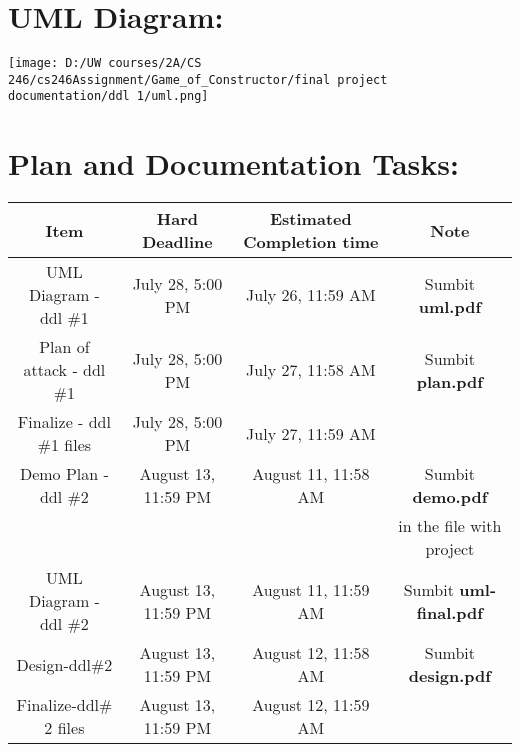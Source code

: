 \documentclass[11pt]{article}
\begin{document}
\parindent=0pt

\newcommand{\colorP}[1]{\colorbox{pink}{#1}}
\newcommand{\colorY}[1]{\colorbox{yellow}{#1}}
\newcommand{\Strategy}{\underline{Strategy} }
\newcommand{\Template}{\underline{Template} }
\newcommand{\Decorator}{\underline{Decorator} }

\section*{UML Diagram:}
\texttt{[image: D:/UW courses/2A/CS 246/cs246Assignment/Game\_of\_Constructor/final project documentation/ddl 1/uml.png]}

\pagebreak

\section*{Plan and Documentation Tasks:}
\begin{tabular}{|c|c|c|c|}\hline
Item & Hard Deadline & Estimated Completion time & Note \\\hline
UML Diagram - ddl \#1 & July 28, 5:00 PM & July 26, 11:59 AM & Sumbit \textbf{uml.pdf}\\\hline
Plan of attack - ddl \#1 & July 28, 5:00 PM & July 27, 11:58 AM & Sumbit \textbf{plan.pdf}\\\hline
Finalize - ddl \#1 files& July 28, 5:00 PM & July 27, 11:59 AM &\\\hline
Demo Plan - ddl \#2 & August 13, 11:59 PM & August 11, 11:58 AM & Sumbit \textbf{demo.pdf} \\
&&&in the file with project\\\hline
UML Diagram - ddl \#2 & August 13, 11:59 PM & August 11, 11:59 AM & Sumbit \textbf{uml-final.pdf}\\\hline
Design-ddl\#2 & August 13, 11:59 PM & August 12, 11:58 AM & Sumbit \textbf{design.pdf}\\\hline
Finalize-ddl\# 2 files & August 13, 11:59 PM & August 12, 11:59 AM & \\\hline
\end{tabular}
\end{document}
